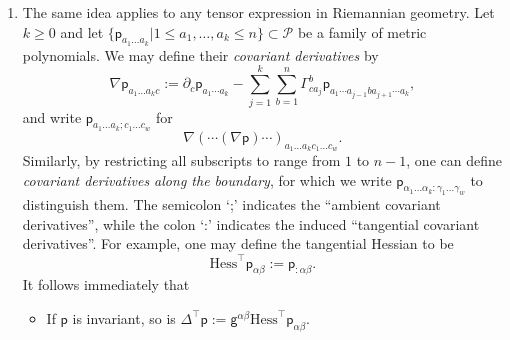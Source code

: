 \documentclass[11pt]{amsart}
\theoremstyle{definition}
\numberwithin{equation}{section}
\begin{document}
\begin{enumerate}
	
\item	 The same idea applies to any tensor expression in Riemannian geometry. Let $k\ge 0$ and let $\{\mathsf p_{a_1\dots a_k}|1\le a_1,\dots,a_k\le n\}\subset\mathcal P$ be a family of metric polynomials. We may define their {\em covariant derivatives} by
	\begin{equation*}
		\label{eq: def of cov diff}
		\nabla\mathsf p_{a_1\dots a_kc} := \partial_{c}\mathsf p_{a_1\cdots a_k}-\sum_{j=1}^k\sum_{b=1}^n\mathsf\Gamma_{ca_j}^{b}\mathsf p_{a_1\cdots a_{j-1}ba_{j+1}\cdots a_k},
	\end{equation*}
	and write $\mathsf p_{a_1\dots a_k;c_1\dots c_w}$ for
	\[\nabla(\cdots(\nabla\mathsf p)\cdots)_{a_1\dots a_kc_1\dots c_w}.\]
	Similarly, by restricting all subscripts to range from $1$ to $n-1$, one can define {\em covariant derivatives along the boundary}, for which we write $\mathsf p_{\alpha_1\dots\alpha_k:\gamma_1\dots \gamma_w}$ to distinguish them. The semicolon `;' indicates the ``ambient covariant derivatives'', while the colon `:' indicates the induced ``tangential covariant derivatives''. For example, one may define the tangential Hessian to be 
	\[
	\mathrm{Hess}^\top\mathsf p_{\alpha\beta} := \mathsf p_{:\alpha\beta}.
	\]
	It follows immediately that
	\begin{itemize}
		\item If $\mathsf p$ is invariant, so is $\mathsf{\Delta^\top p} := \mathsf g^{\alpha\beta}\mathrm{Hess}^\top\mathsf p_{\alpha\beta}$.
	\end{itemize}
	

\end{enumerate}
\end{document}
